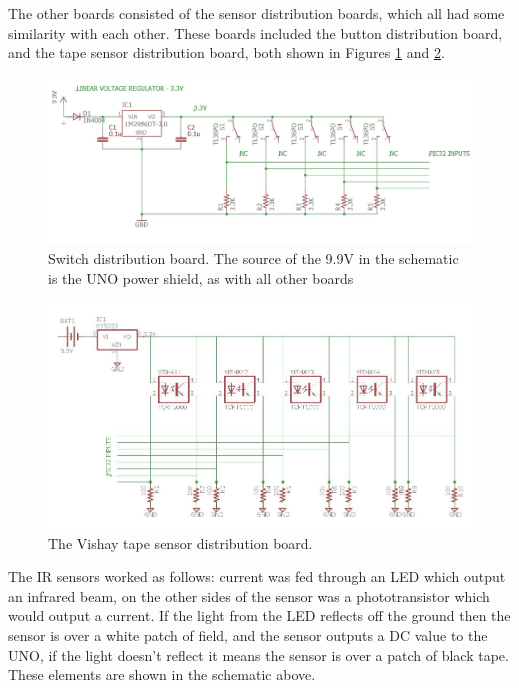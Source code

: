 \documentclass[]{article}
\begin{document}
The other boards consisted of the sensor distribution boards, which all had some similarity with each other. These boards included the button distribution board, and the tape sensor distribution board, both shown in Figures \ref{button distro} and \ref{tape sensor distro}.

\begin{figure}[H]
    \Centering
    \includegraphics[scale = 0.5]{BUTTON-DISTRIBUTION-BOARD.JPG}
    \caption{ Switch distribution board. The source of the 9.9V in the schematic is the UNO power shield, as with all other boards}
    \label{button distro}
\end{figure}

\begin{figure}[H]
    \Centering
    \includegraphics[scale = 0.5]{VishayDistro.JPG}
    \caption{The Vishay tape sensor distribution board.}
    \label{tape sensor distro}
\end{figure}

The IR sensors worked as follows: current was fed through an LED which output an infrared beam, on the other sides of the sensor was a phototransistor which would output a current. If the light from the LED reflects off the ground then the sensor is over a white patch of field, and the sensor outputs a DC value to the UNO, if the light doesn't reflect it means the sensor is over a patch of black tape. These elements are shown in the schematic above.
\end{document}
